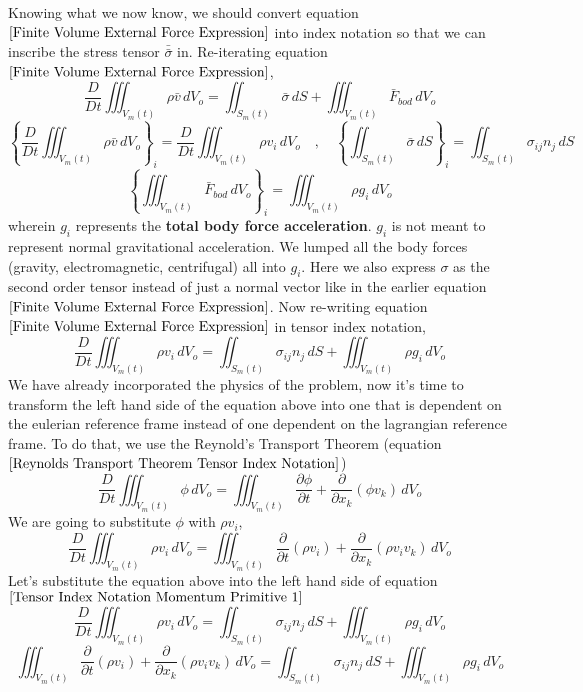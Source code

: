 Knowing what we now know, we should convert equation $\ref{Finite Volume External Force Expression}$ into index notation so that we can inscribe the stress tensor $\bar{\bar{\sigma}}$ in.
Re-iterating equation $\ref{Finite Volume External Force Expression}$,
$$\frac{D}{Dt}\iiint^{}_{V_{m}(t)} \rho \bar{v} \,dV_{o} = \iint^{}_{S_{m}(t)} \bar{\sigma} \,dS + \iiint^{}_{V_{m}(t)} \bar{F}_{bod} \,dV_{o}$$
$$\left\{\frac{D}{Dt}\iiint^{}_{V_{m}(t)} \rho \bar{v} \,dV_{o}\right\}_{i} = \frac{D}{Dt}\iiint^{}_{V_{m}(t)} \rho v_{i} \,dV_{o} \quad,\quad
\left\{\iint^{}_{S_{m}(t)} \bar{\sigma} \,dS\right\}_{i} = \iint^{}_{S_{m}(t)} \sigma_{ij}n_{j} \,dS$$
$$\left\{\iiint^{}_{V_{m}(t)} \bar{F}_{bod} \,dV_{o}\right\}_{i} = \iiint^{}_{V_{m}(t)} \rho g_{i} \,dV_{o}$$
wherein $g_{i}$ represents the \textbf{total body force acceleration}.
$g_{i}$ is not meant to represent normal gravitational acceleration.
We lumped all the body forces (gravity, electromagnetic, centrifugal) all into $g_{i}$.
Here we also express $\sigma$ as the second order tensor instead of just a normal vector like in the earlier equation $\ref{Finite Volume External Force Expression}$.
Now re-writing equation $\ref{Finite Volume External Force Expression}$ in tensor index notation,
\begin{equation}\frac{D}{Dt}\iiint^{}_{V_{m}(t)} \rho v_{i} \,dV_{o} = \iint^{}_{S_{m}(t)} \sigma_{ij}n_{j} \,dS + \iiint^{}_{V_{m}(t)} \rho g_{i} \,dV_{o} \label{Tensor Index Notation Momentum Primitive 1}\end{equation}
We have already incorporated the physics of the problem, now it's time to transform the left hand side of the equation above into one that is dependent on the eulerian reference frame instead of one dependent on the lagrangian reference frame.
To do that, we use the Reynold's Transport Theorem (equation $\ref{Reynolds Transport Theorem Tensor Index Notation}$)
$$\frac{D}{Dt}\iiint^{}_{V_{m}(t)} \phi \,dV_{o} = \iiint^{}_{V_{m}(t)} \frac{\partial \phi}{\partial t} + \frac{\partial}{\partial x_{k}} (\phi v_{k}) \,dV_{o}$$
We are going to substitute $\phi$ with $\rho v_{i}$,
$$\frac{D}{Dt}\iiint^{}_{V_{m}(t)} \rho v_{i} \,dV_{o} = \iiint^{}_{V_{m}(t)} \frac{\partial }{\partial t}(\rho v_{i}) + \frac{\partial}{\partial x_{k}} (\rho v_{i} v_{k}) \,dV_{o}$$
Let's substitute the equation above into the left hand side of equation $\ref{Tensor Index Notation Momentum Primitive 1}$
$$\frac{D}{Dt}\iiint^{}_{V_{m}(t)} \rho v_{i} \,dV_{o} = \iint^{}_{S_{m}(t)} \sigma_{ij}n_{j} \,dS + \iiint^{}_{V_{m}(t)} \rho g_{i} \,dV_{o} $$
$$\iiint^{}_{V_{m}(t)} \frac{\partial }{\partial t}(\rho v_{i}) + \frac{\partial}{\partial x_{k}} (\rho v_{i} v_{k}) \,dV_{o} = \iint^{}_{S_{m}(t)} \sigma_{ij}n_{j} \,dS + \iiint^{}_{V_{m}(t)} \rho g_{i} \,dV_{o} $$
